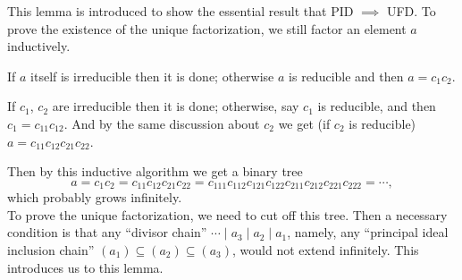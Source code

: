 \documentclass{article}
\begin{document}
\begin{Rmk}{}
    This lemma is introduced to show the essential result that PID $\implies$ UFD. To prove the existence of the unique factorization, we still factor an element $a$ inductively. 
    \begin{compactenum}
        \item If $a$ itself is irreducible then it is done; otherwise $a$ is reducible and then $a = c_1c_2$.
        \item If $c_1$, $c_2$ are irreducible then it is done; otherwise, say $c_1$ is reducible, and then $c_1 = c_{11}c_{12}$. And by the same discussion about $c_2$ we get (if $c_2$ is reducible) $a = c_{11}c_{12}c_{21}c_{22}$.
    \end{compactenum}
    Then by this inductive algorithm we get a binary tree 
    $$a=c_1c_2=c_{11}c_{12}c_{21}c_{22}=c_{111}c_{112}c_{121}c_{122}c_{211}c_{212}c_{221}c_{222}=\cdots,$$
    which probably grows infinitely. \\
    To prove the unique factorization, we need to cut off this tree. Then a necessary condition is that any ``divisor chain'' $\cdots\mid a_3\mid a_2\mid a_1$, namely, any ``principal ideal inclusion chain'' $(a_1)\subseteq (a_2)\subseteq (a_3)$, would not extend infinitely. This introduces us to this lemma.
\end{Rmk}
\end{document}

